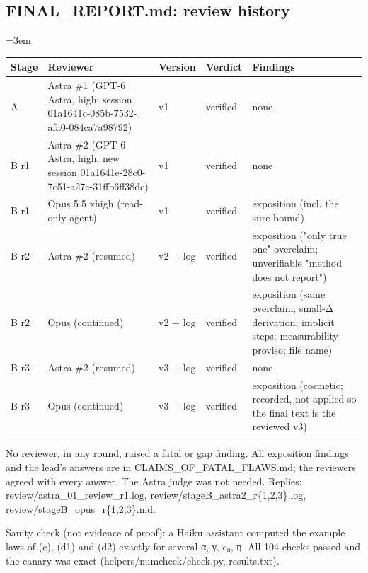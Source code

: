 \documentclass[11pt]{report}
\newenvironment{mdblock}{\begingroup\mdfont\raggedright\setlength{\parindent}{0pt}\setlength{\parskip}{0.55em}\emergencystretch=3em}{\par\endgroup}
\newcommand{\mdhead}[2]{\par\vspace{0.7em}\noindent{\bfseries\ifcase#1\or\large\or\normalsize\or\normalsize\or\small\or\small\or\small\fi #2}\par\nopagebreak\vspace{0.1em}}
\newcommand{\mdsubsec}[1]{\phantomsection\subsection*{#1}}
\begin{document}
\mdsubsec{FINAL\_REPORT.md: review history}
\begin{mdblock}
\mdhead{2}{Review history}

{\small
\begin{longtable}{|>{\raggedright\arraybackslash}p{}|>{\raggedright\arraybackslash}p{}|>{\raggedright\arraybackslash}p{}|>{\raggedright\arraybackslash}p{}|>{\raggedright\arraybackslash}p{}|}
\hline
\textbf{Stage} & \textbf{Reviewer} & \textbf{Version} & \textbf{Verdict} & \textbf{Findings} \\ \hline\endhead
A & Astra \#1 (GPT-6 Astra, high; session 01a1641c-085b-7532-afa0-084ca7a98792) & v1 & verified & none \\ \hline
B r1 & Astra \#2 (GPT-6 Astra, high; new session 01a1641e-28c0-7c51-a27c-31ffb6ff38dc) & v1 & verified & none \\ \hline
B r1 & Opus 5.5 xhigh (read-only agent) & v1 & verified & 11 exposition (incl. the sure bound) \\ \hline
B r2 & Astra \#2 (resumed) & v2 + log & verified & 2 exposition ("only true one" overclaim; unverifiable "method does not report") \\ \hline
B r2 & Opus (continued) & v2 + log & verified & 5 exposition (same overclaim; small-Δ derivation; implicit steps; measurability proviso; file name) \\ \hline
B r3 & Astra \#2 (resumed) & v3 + log & verified & none \\ \hline
B r3 & Opus (continued) & v3 + log & verified & 3 exposition (cosmetic; recorded, not applied so the final text is the reviewed v3) \\ \hline
\end{longtable}}

No reviewer, in any round, raised a fatal or gap finding. All exposition findings and the lead's answers are in {\mdtt CLAIMS\_\allowbreak{}OF\_\allowbreak{}FATAL\_\allowbreak{}FLAWS.\allowbreak{}md}; the reviewers agreed with every answer. The Astra judge was not needed. Replies: {\mdtt review/\allowbreak{}astra\_\allowbreak{}01\_\allowbreak{}review\_\allowbreak{}r1.\allowbreak{}log}, {\mdtt review/\allowbreak{}stageB\_\allowbreak{}astra2\_\allowbreak{}r\{1,\allowbreak{}2,\allowbreak{}3\}.\allowbreak{}log}, {\mdtt review/\allowbreak{}stageB\_\allowbreak{}opus\_\allowbreak{}r\{1,\allowbreak{}2,\allowbreak{}3\}.\allowbreak{}md}.

Sanity check (not evidence of proof): a Haiku assistant computed the example laws of (c), (d1) and (d2) exactly for several α, γ, c₀, η. All 104 checks passed and the canary was exact ({\mdtt helpers/\allowbreak{}numcheck/\allowbreak{}check.\allowbreak{}py}, {\mdtt results.\allowbreak{}txt}).
\end{mdblock}
\end{document}
